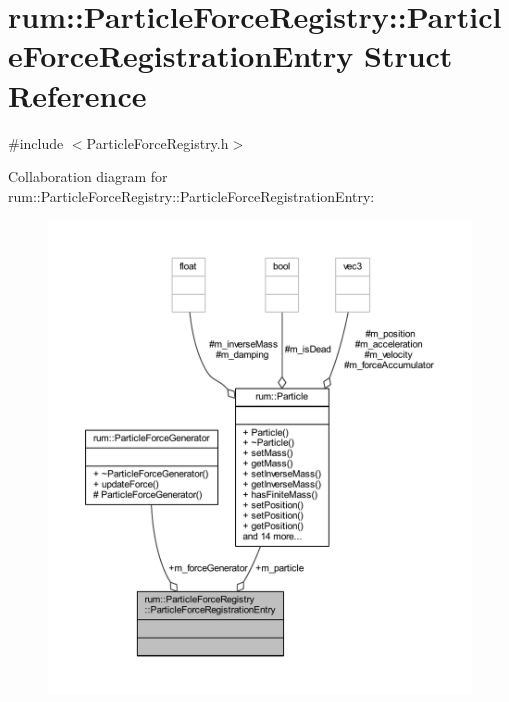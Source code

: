 \hypertarget{structrum_1_1_particle_force_registry_1_1_particle_force_registration_entry}{}\section{rum\+:\+:Particle\+Force\+Registry\+:\+:Particle\+Force\+Registration\+Entry Struct Reference}
\label{structrum_1_1_particle_force_registry_1_1_particle_force_registration_entry}


{\ttfamily \#include $<$Particle\+Force\+Registry.\+h$>$}



Collaboration diagram for rum\+:\+:Particle\+Force\+Registry\+:\+:Particle\+Force\+Registration\+Entry\+:\nopagebreak
\begin{figure}[H]
\begin{center}
\leavevmode
\includegraphics[width=350pt]{structrum_1_1_particle_force_registry_1_1_particle_force_registration_entry__coll__graph}
\end{center}
\end{figure}
